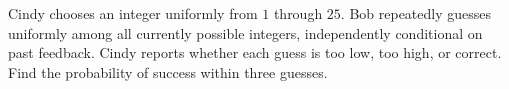 Cindy chooses an integer uniformly from $1$ through $25$. Bob repeatedly guesses uniformly among all currently possible integers, independently conditional on past feedback. Cindy reports whether each guess is too low, too high, or correct. Find the probability of success within three guesses.
